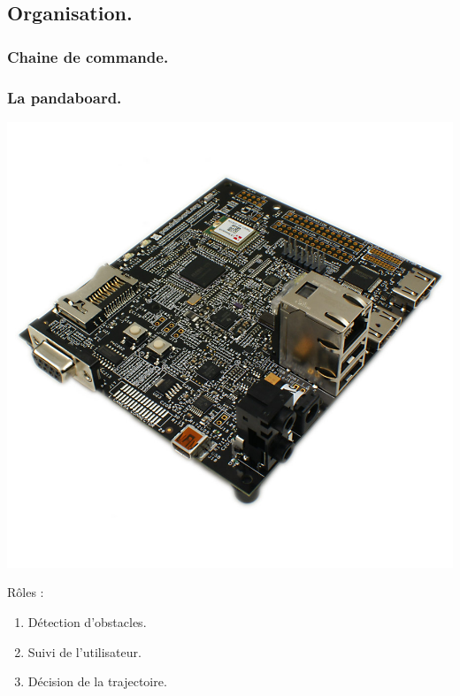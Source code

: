 
\subsection{Organisation.}
\begin{frame}
    \frametitle{Chaine de commande.}
     {
        
    }
     {
        
    }
\end{frame}

\begin{frame}
    \frametitle{La pandaboard.}
    \begin{center}
        \includegraphics[scale=.15]{rcs/panda.png}
    \end{center}
     {
        Rôles : \begin{enumerate}
            \pause \item Détection d'obstacles.
            \pause \item Suivi de l'utilisateur.
            \pause \item Décision de la trajectoire.
        \end{enumerate}
    }
\end{frame}

